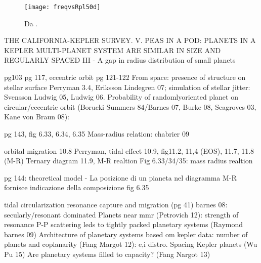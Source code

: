 \begin{workout}

\end{workout}

\begin{figure}[!ht]
\texttt{[image: freqvsRpl50d]}\label{fig:freqvsRpl50d}\caption{Da \cite{}.}
\end{figure}

\begin{workout}
THE CALIFORNIA-KEPLER SURVEY. V. PEAS IN A POD: PLANETS IN A KEPLER MULTI-PLANET SYSTEM ARE SIMILAR IN SIZE AND REGULARLY SPACED
						 III - A gap in radius distribution of small planets
\end{workout}

\begin{workout}
pg103
pg 117, eccentric orbit pg 121-122
From space: presence of structure on stellar surface Perryman 3.4, Eriksson Lindegren 07; simulation of stellar jitter: Svensson Ludwig 05, Ludwig 06.
Probability of randomlyoriented planet on circular/eccentric orbit (Borucki Summers 84/Barnes 07, Burke 08,  Seagroves 03, Kane von Braun 08):
\end{workout}

\begin{workout}
pg 143, fig 6.33, 6.34, 6.35
Mass-radius relation: chabrier 09
\end{workout}

\begin{workout}[M-R diagram]
orbital migration 10.8 Perryman, tidal effect 10.9, 
fig11.2, 11,4 (EOS), 11.7, 11.8 (M-R)
Ternary diagram 11.9, M-R realtion
Fig 6.33/34/35: mass radius realtion

pg 144: theoretical model - La posizione di un pianeta nel diagramma M-R fornisce indicazione della composizione
fig 6.35
\end{workout}

\begin{workout}
\end{workout}

\begin{workout}
tidal circularization
resonance capture and migration (pg 41)
barnes 08: secularly/resonant dominated
Planets near mmr (Petrovich 12): strength of resonance
P-P scattering leds to tightly packed planetary systems (Raymond barnes 09)
Architecture of planetary systems based om kepler data: number of planets and coplanarity (Fang Margot 12): e,i distro.
Spacing Kepler planets (Wu Pu 15)
Are planetary systems filled to capacity? (Fang Nargot 13)
\end{workout}
